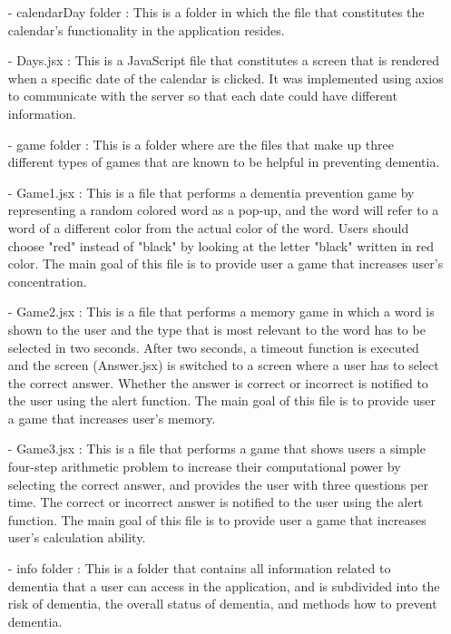 \documentclass[conference]{IEEEtran}
\begin{document}
\begin{enumerate}
        \item[-] calendarDay folder : This is a folder in which the file that constitutes the calendar's functionality in the application resides.\\
        \item[-] Days.jsx : This is a JavaScript file that constitutes a screen that is rendered when a specific date of the calendar is clicked. It was implemented using axios to communicate with the server so that each date could have different information.\\
        \item[-] game folder : This is a folder where are the files that make up three different types of games that are known to be helpful in preventing dementia. \\
        \item[-] Game1.jsx : This is a file that performs a dementia prevention game by representing a random colored word as a pop-up, and the word will refer to a word of a different color from the actual color of the word. Users should choose "red" instead of "black" by looking at the letter "black" written in  red color. The main goal of this file is to provide user a game that increases user's concentration. \\
        \item[-] Game2.jsx : This is a file that performs a memory game in which a word is shown to the user and the type that is most relevant to the word has to be selected in two seconds. After two seconds, a timeout function is executed and the screen (Answer.jsx) is switched to a screen where a user has to select the correct answer. Whether the answer is correct or incorrect is notified to the user using the alert function. The main goal of this file is to provide user a game that increases user's memory.\\
        \item[-] Game3.jsx : This is a file that performs a game that shows users a simple four-step arithmetic problem to increase their computational power by selecting the correct answer, and provides the user with three questions per time. The correct or incorrect answer is notified to the user using the alert function. The main goal of this file is to provide user a game that increases user's calculation ability.\\
        \item[-] info folder : This is a folder that contains all information related to dementia that a user can access in the application, and is subdivided into the risk of dementia, the overall status of dementia, and methods how to prevent dementia.\\

\end{enumerate}
\end{document}
